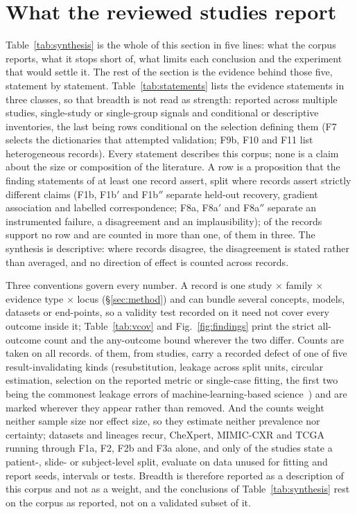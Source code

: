 \section{What the reviewed studies report}
\label{sec:findings}







Table~\ref{tab:synthesis} is the whole of this section in five lines: what the corpus reports, what it
stops short of, what limits each conclusion and the experiment that would settle it. The rest of the
section is the evidence behind those five, statement by statement. Table~\ref{tab:statements} lists the
\Fnrows{} evidence statements in three classes, so that breadth is not read as strength: \Fnmulti{}
reported across multiple studies, \Fnsingle{} single-study or single-group signals and \Fncond{}
conditional or descriptive inventories, the last being rows conditional on the selection defining them
(F7 selects the dictionaries that attempted validation; F9b, F10 and F11 list heterogeneous records).
Every statement describes this corpus; none is a claim about the size or composition of the literature.
A row is a proposition that the finding statements of at least one record assert, split where records
assert strictly different claims (F1b, F1b$'$ and F1b$''$ separate held-out recovery, gradient
association and labelled correspondence; F8a, F8a$'$ and F8a$''$ separate an instrumented failure, a
disagreement and an implausibility); of the \Nclaims{} records \Fnorow{} support no row and \Fmultirow{} are counted in more than one, \Fmultithree{} of them in three. The synthesis is descriptive: where records disagree, the disagreement is stated rather than averaged, and no direction of
effect is counted across records.

Three conventions govern every number. A record is one study $\times$ family $\times$ evidence type
$\times$ locus (\S\ref{sec:method}) and can bundle several concepts, models, datasets or end-points, so a
validity test recorded on it need not cover every outcome inside it; Table~\ref{tab:vcov} and
Fig.~\ref{fig:findings} print the strict all-outcome count and the any-outcome bound wherever the two
differ. Counts are taken on all \Nclaims{} records. \Fflagrec{} of them, from \Fdefstud{} studies, carry a recorded defect of one of five result-invalidating kinds (resubstitution, leakage across split units, circular estimation, selection on
the reported metric or single-case fitting, the first two being the commonest leakage errors of
machine-learning-based science~\cite{kapoor2023leakage}) and are marked wherever they appear rather than removed. And the counts weight neither sample size nor effect size, so they estimate neither prevalence
nor certainty; datasets and lineages recur, CheXpert, MIMIC-CXR and TCGA running through F1a, F2, F2b and
F3a alone, and only \Nminvalid{} of the \Ncore{} studies state a patient-, slide- or subject-level split,
evaluate on data unused for fitting and report seeds, intervals or tests. Breadth is therefore reported as
a description of this corpus and not as a weight, and the conclusions of Table~\ref{tab:synthesis} rest on
the corpus as reported, not on a validated subset of it.


